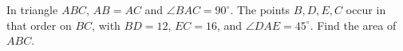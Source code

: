 In triangle $ABC$, $AB=AC$ and $\angle BAC=90^\circ$. The points $B,D,E,C$ occur in that order on $BC$, with $BD=12$, $EC=16$, and $\angle DAE=45^\circ$. Find the area of $ABC$.
